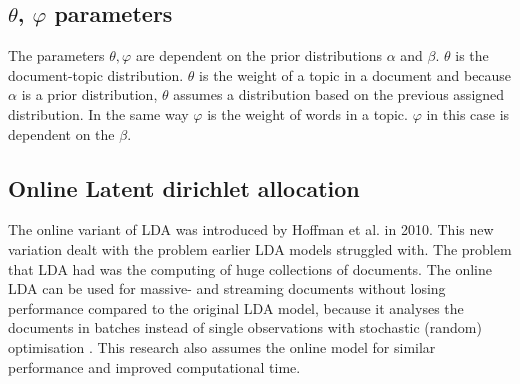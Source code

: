 \subsection{$\theta$, $\varphi$ parameters}\label{theory:thetavarphi}
The parameters $\theta, \varphi$ are dependent on the prior distributions $\alpha$ and $\beta$. $\theta$ is the document-topic distribution. $\theta$ is the weight of a topic in a document and because $\alpha$ is a prior distribution, $\theta$ assumes a distribution based on the previous assigned distribution. 
In the same way $\varphi$ is the weight of words in a topic. $\varphi$ in this case is dependent on the $\beta$.

\subsection{Online Latent dirichlet allocation} \label{theory:onlinelda}
The online variant of LDA was introduced  by Hoffman et al. in 2010.\cite{Hoffman2010OnlineAllocation} This new variation dealt with the problem earlier LDA models struggled with. The problem that LDA had was the computing of huge collections of documents. The online LDA can be used for massive- and streaming documents without losing performance compared to the original LDA model, because it analyses the documents in batches instead of single observations with stochastic (random) optimisation \cite{Beaver2012}. This research also assumes the online model for similar performance and improved computational time.


